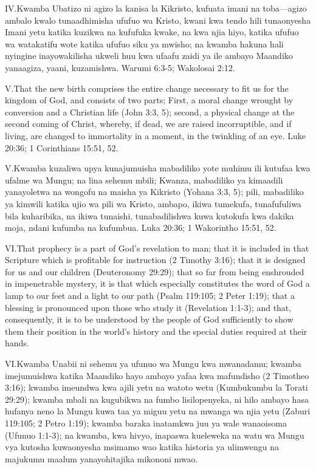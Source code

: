\lettrine{IV.} Kwamba Ubatizo ni agizo la kanisa la Kikristo, kufuata imani na toba—agizo ambalo kwalo tunaadhimisha ufufuo wa Kristo, kwani kwa tendo hili tunaonyesha Imani yetu katika kuzikwa na kufufuka kwake, na kwa njia hiyo, katika ufufuo wa watakatifu wote katika ufufuo siku ya mwisho; na kwamba hakuna hali nyingine inayowakilisha ukweli huu kwa ufaafu zaidi ya ile ambayo Maandiko yanaagiza, yaani, kuzamishwa. Warumi 6:3-5; Wakolosai 2:12.


\lettrine{V.} That the new birth comprises the entire change necessary to fit us for the kingdom of God, and consists of two parts; First, a moral change wrought by conversion and a Christian life (John 3:3, 5); second, a physical change at the second coming of Christ, whereby, if dead, we are raised incorruptible, and if living, are changed to immortality in a moment, in the twinkling of an eye. Luke 20:36; 1 Corinthians 15:51, 52.


\lettrine{V.} Kwamba kuzaliwa upya kunajumuisha mabadiliko yote muhimu ili kutufaa kwa ufalme wa Mungu; na lina sehemu mbili; Kwanza, mabadiliko ya kimaadili yanayoletwa na wongofu na maisha ya Kikristo (Yohana 3:3, 5); pili, mabadiliko ya kimwili katika ujio wa pili wa Kristo, ambapo, ikiwa tumekufa, tunafufuliwa bila kuharibika, na ikiwa tunaishi, tunabadilishwa kuwa kutokufa kwa dakika moja, ndani kufumba na kufumbua. Luka 20:36; 1 Wakorintho 15:51, 52.


\lettrine{VI.} That prophecy is a part of God’s revelation to man; that it is included in that Scripture which is profitable for instruction (2 Timothy 3:16); that it is designed for us and our children (Deuteronomy 29:29); that so far from being enshrouded in impenetrable mystery, it is that which especially constitutes the word of God a lamp to our feet and a light to our path (Psalm 119:105; 2 Peter 1:19); that a blessing is pronounced upon those who study it (Revelation 1:1-3); and that, consequently, it is to be understood by the people of God sufficiently to show them their position in the world’s history and the special duties required at their hands.


\lettrine{VI.} Kwamba Unabii ni sehemu ya ufunuo wa Mungu kwa mwanadamu; kwamba imejumuishwa katika Maandiko hayo ambayo yafaa kwa mafundisho (2 Timotheo 3:16); kwamba imeundwa kwa ajili yetu na watoto wetu (Kumbukumbu la Torati 29:29); kwamba mbali na kugubikwa na fumbo lisilopenyeka, ni hilo ambayo hasa hufanya neno la Mungu kuwa taa ya miguu yetu na mwanga wa njia yetu (Zaburi 119:105; 2 Petro 1:19); kwamba baraka inatamkwa juu ya wale wanaoisoma (Ufunuo 1:1-3); na kwamba, kwa hivyo, inapaswa kueleweka na watu wa Mungu vya kutosha kuwaonyesha msimamo wao katika historia ya ulimwengu na majukumu maalum yanayohitajika mikononi mwao.


